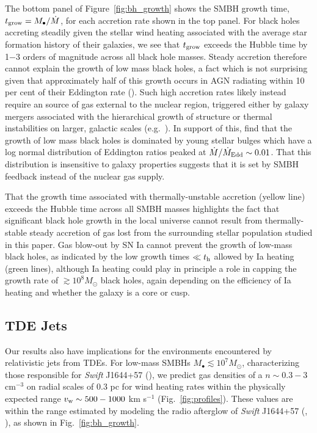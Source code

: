 \documentclass[usenatbib,fleqn]{mn2e}
\newcommand{\Mdot}{\dot{M}}
\newcommand{\MdotEdd}{\dot{M}_{\rm Edd}}
\begin{document}
The bottom panel of Figure~\ref{fig:bh_growth} shows the SMBH growth
time, $t_{\rm grow} = M_{\bullet}/\dot{M}$, for each accretion rate
shown in the top panel.  For black holes accreting steadily given the
stellar wind heating associated with the average star formation
history of their galaxies, we see that $t_{\rm grow}$ exceeds the
Hubble time by 1$-$3 orders of magnitude across all black hole masses.
Steady accretion therefore cannot explain the growth of low mass black
holes, a fact which is not surprising given that approximately half of
this growth occurs in AGN radiating within 10 per cent of their
Eddington rate (\citealt{Heckman+04}).  Such high accretion rates
likely instead require an source of gas external to the nuclear
region, triggered either by galaxy mergers associated with the
hierarchical growth of structure or thermal instabilities on larger,
galactic scales (e.g.~\citealt{Ciotti+10}).  In support of this,
\citet{Kauffmann&Heckman09} find that the growth of low mass black
holes is dominated by young stellar bulges which have a log normal
distribution of Eddington ratios peaked at $\Mdot/\MdotEdd\sim
0.01$. That this distribution is insensitive to galaxy properties
suggests that it is set by SMBH feedback instead of the nuclear gas
supply.

That the growth time associated with thermally-unstable accretion
(yellow line) exceeds the Hubble time across all SMBH masses
highlights the fact that significant black hole growth in the local
universe cannot result from thermally-stable steady accretion of gas
lost from the surrounding stellar population studied in this paper.
Gas blow-out by SN Ia cannot prevent the growth of low-mass black
holes, as indicated by the low growth times $\ll t_{\rm h}$ allowed by
Ia heating (green lines), although Ia heating could play in principle
a role in capping the growth rate of $\gtrsim 10^{8}M_{\odot}$ black
holes, again depending on the efficiency of Ia heating and whether the
galaxy is a core or cusp.


\subsection{TDE Jets}
\label{sec:TDE}

Our results also have implications for the environments encountered by
relativistic jets from TDEs.  For low-mass SMBHs $M_{\bullet} \lesssim
10^{7}M_{\odot}$, characterizing those responsible for {\it Swift}
J1644+57 (\citealt{Bloom+11}), we predict gas densities of a $n
\sim 0.3-3$ cm$^{-3}$ on radial scales of 0.3 pc for wind heating
rates within the physically expected range $v_{\rm w} \sim 500-1000$
km s$^{-1}$ (Fig.~\ref{fig:profiles}).  These values are within the
range estimated by modeling the radio afterglow of {\it Swift}
J1644+57 (\citealt{Metzger+12}, \citealt{BergerZauderer+:2012a}), as shown in Fig.~\ref{fig:bh_growth}.
\end{document}
